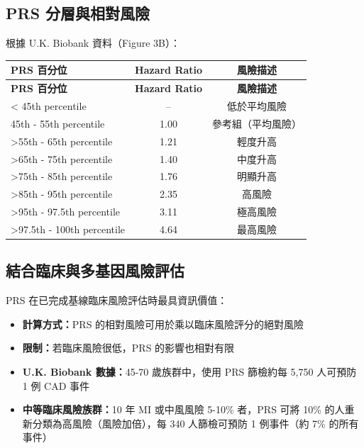 \documentclass[12pt,a4paper]{article}
\begin{document}
\subsection{PRS 分層與相對風險}

根據 U.K. Biobank 資料（Figure 3B）：

\begin{longtable}{p{5cm}cc}
\toprule
\textbf{PRS 百分位} & \textbf{Hazard Ratio} & \textbf{風險描述} \\
\midrule
\endfirsthead

\toprule
\textbf{PRS 百分位} & \textbf{Hazard Ratio} & \textbf{風險描述} \\
\midrule
\endhead

\bottomrule
\endfoot

< 45th percentile & -- & 低於平均風險 \\
\midrule
45th - 55th percentile & 1.00 & 參考組（平均風險） \\
\midrule
>55th - 65th percentile & 1.21 & 輕度升高 \\
\midrule
>65th - 75th percentile & 1.40 & 中度升高 \\
\midrule
>75th - 85th percentile & 1.76 & 明顯升高 \\
\midrule
>85th - 95th percentile & 2.35 & 高風險 \\
\midrule
>95th - 97.5th percentile & 3.11 & 極高風險 \\
\midrule
>97.5th - 100th percentile & 4.64 & 最高風險 \\
\bottomrule
\end{longtable}

\subsection{結合臨床與多基因風險評估}

PRS 在已完成基線臨床風險評估時最具資訊價值：

\begin{itemize}
    \item \textbf{計算方式：}PRS 的相對風險可用於乘以臨床風險評分的絕對風險
    \item \textbf{限制：}若臨床風險很低，PRS 的影響也相對有限
    \item \textbf{U.K. Biobank 數據：}45-70 歲族群中，使用 PRS 篩檢約每 5,750 人可預防 1 例 CAD 事件
    \item \textbf{中等臨床風險族群：}10 年 MI 或中風風險 5-10\% 者，PRS 可將 10\% 的人重新分類為高風險（風險加倍），每 340 人篩檢可預防 1 例事件（約 7\% 的所有事件）
\end{itemize}
\end{document}
